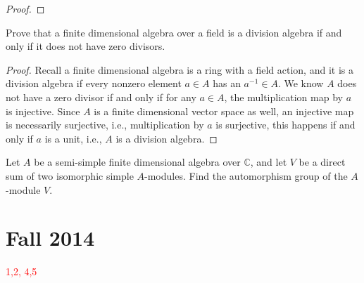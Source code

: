 \documentclass[openany]{book}
\begin{document}
\begin{proof}
    




\end{proof}

\begin{prob}
    Prove that a finite dimensional algebra over a field is a division algebra if and only if it does not have zero divisors.
\end{prob}
\begin{proof}
    Recall a finite dimensional algebra is a ring with a field action, and it is a division algebra if every nonzero element $a\in A$ has an $a^{-1}\in A$. We know $A$ does not have a zero divisor if and only if for any $a\in A$, the multiplication map by $a$ is injective. Since $A$ is a finite dimensional vector space as well, an injective map is necessarily surjective, i.e., multiplication by $a$ is surjective, this happens if and only if $a$ is a unit, i.e., $A$ is a division algebra.
\end{proof}


\begin{prob}
    Let \(A\) be a semi-simple finite dimensional algebra over \(\mathbb{C}\), and let \(V\) be a direct sum of two isomorphic simple \(A\)-modules. Find the automorphism group of the \(A\)-module \(V\).
\end{prob}

\chapter{Fall 2014}


\textcolor{red}{1,2, 4,5}
\end{document}
